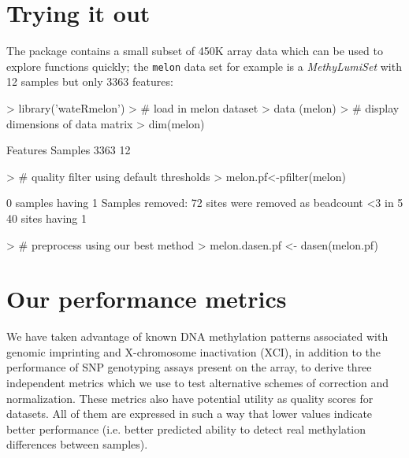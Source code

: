 \documentclass[11pt]{article}
\newcommand{\Robject}[1]{{\texttt{#1}}}
\newcommand{\Rclass}[1]{{\textit{#1}}}
\begin{document}
\section{Trying it out}
The package contains a small subset of 450K array data which can be used to 
explore functions quickly; the \Robject{melon} data set for example is a \Rclass{MethyLumiSet}
with 12 samples but only 3363 features:



\begin{Schunk}
\begin{Sinput}
> library('wateRmelon')
> # load in melon dataset
> data (melon)                   
> # display dimensions of data matrix
> dim(melon)                     
\end{Sinput}
\begin{Soutput}
Features  Samples 
    3363       12 
\end{Soutput}
\begin{Sinput}
> # quality filter using default thresholds
> melon.pf<-pfilter(melon)       
\end{Sinput}
\begin{Soutput}
0 samples having 1 %
Samples removed:  
72 sites were removed as beadcount <3 in 5 %
40 sites having 1 %
\end{Soutput}
\begin{Sinput}
> # preprocess using our best method     
> melon.dasen.pf <- dasen(melon.pf) 
\end{Sinput}
\end{Schunk}

\section{Our performance metrics}
We have taken advantage of known DNA methylation patterns associated with genomic 
imprinting and X-chromosome inactivation (XCI), in addition to the performance of 
SNP genotyping assays present on the array, to derive three independent metrics
which we use to test alternative schemes of correction and normalization.  
These metrics also have potential utility as quality scores for datasets. All
of them are expressed in such a way that lower values indicate better performance
(i.e. better predicted ability to detect real methylation differences between samples).
\end{document}
